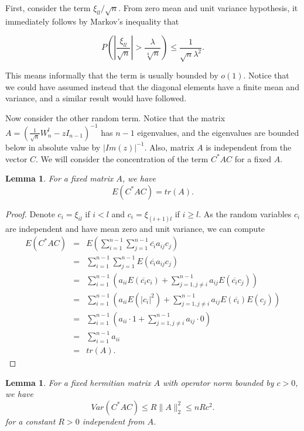 \documentclass[12pt,a4paper,leqno]{report}
\theoremstyle{plain}
\newtheorem{lem}[equation]{Lemma}
\theoremstyle{definition}
\theoremstyle{remark}
\begin{document}
First, consider the term $\xi_{ll}/\sqrt{n}$. From zero mean and unit variance hypothesis, it immediately follows by Markov's inequality that

\begin{equation*}
P(|\frac{\xi_{ll}}{\sqrt{n}}|>\frac{\lambda}{\sqrt[4]{n}}) \leq \frac{1}{\sqrt{n}\lambda^2}. 
\end{equation*}

This means informally that the term is usually bounded by $o(1)$. Notice that we could have assumed instead that the diagonal elements have a finite mean and variance, and a similar result would have followed.

Now consider the other random term. Notice that the matrix $A = (\frac{1}{\sqrt{n}}W_n^l-zI_{n-1})^{-1}$ has $n-1$ eigenvalues, and the eigenvalues are bounded below in absolute value by $|Im(z)|^{-1}$. Also, matrix $A$ is independent from the vector $C$. We will consider the concentration of the term $C^* A C$ for a fixed $A$.

\begin{lem}
For a fixed matrix $A$, we have
\begin{equation*}
E(C^* A C) = tr(A).
\end{equation*}
\end{lem}

\begin{proof}
Denote $c_i = \xi_{il}$ if $i<l$ and $c_i = \xi_{(i+1)l}$ if $i\geq l$.
As the random variables $c_i$ are independent and have mean zero and unit variance, we can compute
\begin{eqnarray*}
E(C^* A C) & = & E(\sum_{i=1}^{n-1} \sum_{j=1}^{n-1} \overline{c_i} a_{ij} c_j)\\
& = & \sum_{i=1}^{n-1} \sum_{j=1}^{n-1} E(\overline{c_i} a_{ij} c_j)\\
& = & \sum_{i=1}^{n-1} (a_{ii} E(\overline{c_i}c_i) + \sum_{j=1,j \neq i}^{n-1} a_{ij} E(\overline{c_i} c_j))\\
& = & \sum_{i=1}^{n-1} (a_{ii} E(|c_i|^2 ) + \sum_{j=1,j \neq i}^{n-1} a_{ij} E(\overline{c_i}) E(c_j))\\
& = & \sum_{i=1}^{n-1} (a_{ii} \cdot 1 + \sum_{j=1,j \neq i}^{n-1} a_{ij} \cdot 0)\\
& = & \sum_{i=1}^{n-1} a_{ii}\\
& = & tr(A).
\end{eqnarray*} 
\end{proof}

\begin{lem}
For a fixed hermitian matrix $A$ with operator norm bounded by $c>0$, we have
\begin{equation*}
Var(C^* A C) \leq R \| A \|_2^2 \leq n R c^2.
\end{equation*}
for a constant $R>0$ independent from $A$.
\end{lem}
\end{document}
